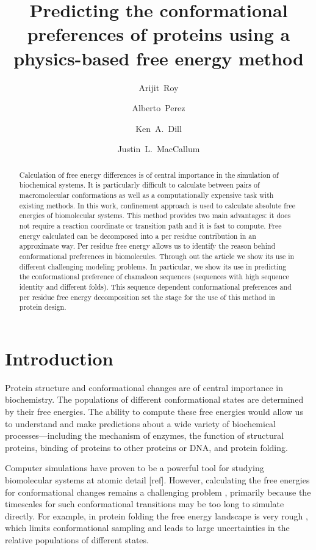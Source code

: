 \documentclass[12pt]{article}
\author{Arijit~Roy}
\author{Alberto~Perez}
\author{Ken~A.~Dill}
\author{Justin~L.~MacCallum}
\affil{Laufer Center for Physical and Quantitative Biology\\
    Stony Brook University\\
    Stony Brook, NY 11794-5252.}
\title{Predicting the conformational preferences of proteins using a physics-based free energy
method}
\begin{document}
\maketitle

\begin{abstract}

Calculation of free energy differences is of central importance in the simulation of biochemical
systems. It is particularly difficult to calculate between pairs of macromolecular conformations as
well as a computationally expensive task with existing methods. In this work, confinement approach
is used to calculate absolute free energies of biomolecular systems. This method provides two main
advantages: it does not require a reaction coordinate or transition path and it is fast to compute.
Free energy calculated can be decomposed into a per residue contribution in an approximate way. Per
residue free energy allows us to identify the reason behind conformational preferences in
biomolecules. Through out the article we show its use in different challenging modeling problems. In
particular, we show its use in predicting the conformational preference of chamaleon sequences
(sequences with high sequence identity and different folds). This sequence dependent conformational
preferences and per residue free energy decomposition set the stage for the use of this method in
protein design.

\end{abstract}


\section{Introduction}

Protein structure and conformational changes are of central importance in biochemistry. The
populations of different conformational states are determined by their free energies. The ability to
compute these free energies would allow us to understand and make predictions about a wide variety
of biochemical processes---including the mechanism of enzymes, the function of structural proteins,
binding of proteins to other proteins or DNA, and protein folding.

Computer simulations have proven to be a powerful tool for studying biomolecular systems at atomic
detail [ref]. However, calculating the free energies for conformational changes remains a
challenging problem \cite{Meirovitch2007}, primarily because the timescales for such conformational
transitions may be too long to simulate directly. For example, in protein folding the free energy
landscape is very rough \cite{Dill1997,Dill2008}, which limits conformational sampling and leads to
large uncertainties in the relative populations of different states.
\end{document}
